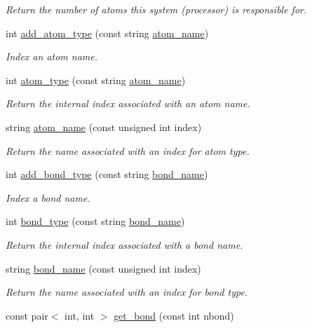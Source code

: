 \begin{DoxyCompactItemize}
\begin{DoxyCompactList}\small\item\em Return the number of atoms this system (processor) is responsible for. \end{DoxyCompactList}\item 
int \hyperlink{classSystem_acfc399929213def0e539ab372cc07e8b}{add\-\_\-atom\-\_\-type} (const string \hyperlink{classSystem_a3e3d717c9362e163e6fc67ad7ff8b916}{atom\-\_\-name})
\begin{DoxyCompactList}\small\item\em Index an atom name. \end{DoxyCompactList}\item 
int \hyperlink{classSystem_afdb1451f2730a8c1f41ee75696cf2dc6}{atom\-\_\-type} (const string \hyperlink{classSystem_a3e3d717c9362e163e6fc67ad7ff8b916}{atom\-\_\-name})
\begin{DoxyCompactList}\small\item\em Return the internal index associated with an atom name. \end{DoxyCompactList}\item 
string \hyperlink{classSystem_a3e3d717c9362e163e6fc67ad7ff8b916}{atom\-\_\-name} (const unsigned int index)
\begin{DoxyCompactList}\small\item\em Return the name associated with an index for atom type. \end{DoxyCompactList}\item 
int \hyperlink{classSystem_a6c4660389a9be14fd2b73c7b03b992ec}{add\-\_\-bond\-\_\-type} (const string \hyperlink{classSystem_a8fa1e042039932552434fbba4b0c2a6d}{bond\-\_\-name})
\begin{DoxyCompactList}\small\item\em Index a bond name. \end{DoxyCompactList}\item 
int \hyperlink{classSystem_a71543a871f18ac7e139d150d86580a55}{bond\-\_\-type} (const string \hyperlink{classSystem_a8fa1e042039932552434fbba4b0c2a6d}{bond\-\_\-name})
\begin{DoxyCompactList}\small\item\em Return the internal index associated with a bond name. \end{DoxyCompactList}\item 
string \hyperlink{classSystem_a8fa1e042039932552434fbba4b0c2a6d}{bond\-\_\-name} (const unsigned int index)
\begin{DoxyCompactList}\small\item\em Return the name associated with an index for bond type. \end{DoxyCompactList}\item 
\hypertarget{classSystem_ac58eb7d9e310d43b3c3922bb1845406e}{const pair$<$ int, int $>$ \hyperlink{classSystem_ac58eb7d9e310d43b3c3922bb1845406e}{get\-\_\-bond} (const int nbond)}\label{classSystem_ac58eb7d9e310d43b3c3922bb1845406e}


\end{DoxyCompactItemize}
